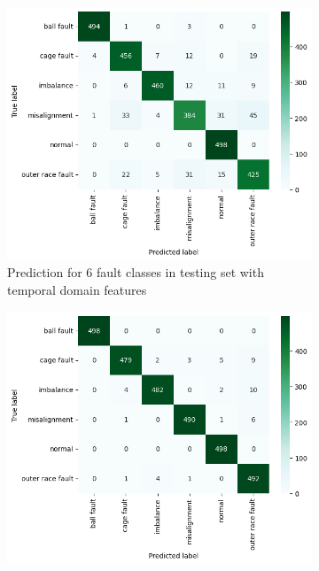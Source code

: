 \begin{figure}[ht]
    \centering
    \begin{subfigure}[b]{0.49\textwidth}
        \includegraphics[width=\textwidth]{assets/design/kNN-temporal-confusion-matrix-fault.png}
        \caption{Prediction for 6 fault classes in testing set with temporal domain features}
    \end{subfigure}
    \hfill
    \begin{subfigure}[b]{0.49\textwidth}
        \includegraphics[width=\textwidth]{assets/design/kNN-spectral-confusion-matrix-fault.png}

\end{subfigure}
\end{figure}
